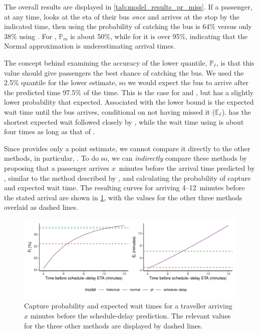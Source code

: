 The overall results are displayed in \cref{tab:model_results_pr_miss}. If a passenger, at any time, looks at the \gls{eta} of their bus \emph{once} and arrives at the stop by the indicated time, then using \Fpf{} the probability of catching the bus is 64\% versus only 38\% using \Fsched{}. For \Fhist{}, $\mathbb{P}_m$ is about 50\%, while for \Fnorm{} it is over 95\%, indicating that the Normal approximation is underestimating arrival times.


The concept behind examining the accuracy of the lower quantile, $\mathbb{P}_\ell$, is that this value should give passengers the best chance of catching the bus. We used the 2.5\% quantile for the lower estimate, so we would expect the bus to arrive after the predicted time 97.5\% of the time. This is the case for \Fnorm{} and \Fhist{}, but \Fpf{} has a slightly lower probability that expected. Associated with the lower bound is the expected wait time until the bus arrives, conditional on not having missed it ($\mathbb{E}_\ell$). \Fpf{} has the shortest expected wait followed closely by \Fhist{}, while the wait time using \Fnorm{} is about four times as long as that of \Fpf{}.


Since \Fsched{} provides only a point estimate, we cannot compare it directly to the other methods, in particular, \Fpf{}. To do so, we can \emph{indirectly} compare these methods by proposing that a passenger arrives $x$~minutes before the arrival time predicted by \Fsched{}, similar to the method described by \citet{Cathey_2003}, and calculating the probability of capture and expected wait time. The resulting curves for arriving 4--12~minutes before the stated arrival are shown in \cref{fig:model_results_pr_gtfs}, with the values for the other three methods overlaid as dashed lines.


\begin{knitrout}\small
{}\color{fgcolor}\begin{figure}

{\centering \includegraphics[width=\textwidth]{figure/model_results_pr_gtfs-1} 

}

\caption[Capture probability and expected wait times for schedule-delay predictions]{Capture probability and expected wait times for a traveller arriving $x$ minutes before the schedule-delay prediction. The relevant values for the three other methods are displayed by dashed lines.}\label{fig:model_results_pr_gtfs}
\end{figure}


\end{knitrout}



